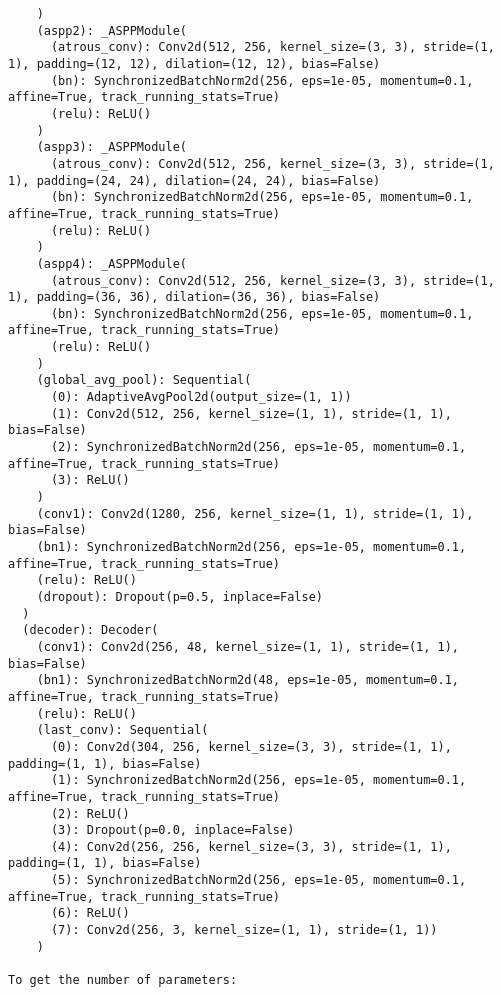 \begin{verbatim}
    )
    (aspp2): _ASPPModule(
      (atrous_conv): Conv2d(512, 256, kernel_size=(3, 3), stride=(1, 1), padding=(12, 12), dilation=(12, 12), bias=False)
      (bn): SynchronizedBatchNorm2d(256, eps=1e-05, momentum=0.1, affine=True, track_running_stats=True)
      (relu): ReLU()
    )
    (aspp3): _ASPPModule(
      (atrous_conv): Conv2d(512, 256, kernel_size=(3, 3), stride=(1, 1), padding=(24, 24), dilation=(24, 24), bias=False)
      (bn): SynchronizedBatchNorm2d(256, eps=1e-05, momentum=0.1, affine=True, track_running_stats=True)
      (relu): ReLU()
    )
    (aspp4): _ASPPModule(
      (atrous_conv): Conv2d(512, 256, kernel_size=(3, 3), stride=(1, 1), padding=(36, 36), dilation=(36, 36), bias=False)
      (bn): SynchronizedBatchNorm2d(256, eps=1e-05, momentum=0.1, affine=True, track_running_stats=True)
      (relu): ReLU()
    )
    (global_avg_pool): Sequential(
      (0): AdaptiveAvgPool2d(output_size=(1, 1))
      (1): Conv2d(512, 256, kernel_size=(1, 1), stride=(1, 1), bias=False)
      (2): SynchronizedBatchNorm2d(256, eps=1e-05, momentum=0.1, affine=True, track_running_stats=True)
      (3): ReLU()
    )
    (conv1): Conv2d(1280, 256, kernel_size=(1, 1), stride=(1, 1), bias=False)
    (bn1): SynchronizedBatchNorm2d(256, eps=1e-05, momentum=0.1, affine=True, track_running_stats=True)
    (relu): ReLU()
    (dropout): Dropout(p=0.5, inplace=False)
  )
  (decoder): Decoder(
    (conv1): Conv2d(256, 48, kernel_size=(1, 1), stride=(1, 1), bias=False)
    (bn1): SynchronizedBatchNorm2d(48, eps=1e-05, momentum=0.1, affine=True, track_running_stats=True)
    (relu): ReLU()
    (last_conv): Sequential(
      (0): Conv2d(304, 256, kernel_size=(3, 3), stride=(1, 1), padding=(1, 1), bias=False)
      (1): SynchronizedBatchNorm2d(256, eps=1e-05, momentum=0.1, affine=True, track_running_stats=True)
      (2): ReLU()
      (3): Dropout(p=0.0, inplace=False)
      (4): Conv2d(256, 256, kernel_size=(3, 3), stride=(1, 1), padding=(1, 1), bias=False)
      (5): SynchronizedBatchNorm2d(256, eps=1e-05, momentum=0.1, affine=True, track_running_stats=True)
      (6): ReLU()
      (7): Conv2d(256, 3, kernel_size=(1, 1), stride=(1, 1))
    )

To get the number of parameters:


\end{verbatim}
